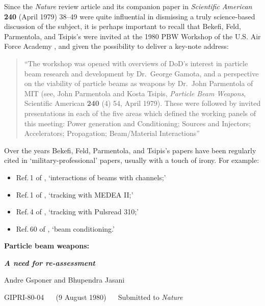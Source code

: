 \documentclass [12pt,a4paper,     ]{report} %
\begin{document}
Since the \emph{Nature} review article and its companion paper in \emph{Scientific American} {\bf 240} (April 1979) 38--49 were quite influential in dismissing a truly science-based discussion of the subject, it is perhaps important to recall that Bekefi, Feld, Parmentola, and Tsipis's  were invited at the 1980 PBW Workshop of the U.S. Air Force Academy \cite{GUENT1980-}, and given the possibility to deliver a key-note address:

\begin{quote}

``The workshop was opened with overviews of DoD's interest in particle beam research and development by Dr.~George Gamota, and a perspective on the viability of particle beams as weapons by Dr.~John Parmentola of MIT (see, John Parmentola and Kosta Tsipis, \emph{Particle Beam Weapons}, Scientific American {\bf 240} (4) 54, April 1979).  These were followed by invited presentations in each of the five areas which defined the working panels of this meeting: Power generation and Conditioning; Sources and Injectors; Accelerators; Propagation; Beam/Material Interactions'' \cite[p.\,1]{GUENT1980-}



\end{quote}
%
Over the years Bekefi, Feld, Parmentola, and Tsipis's papers have been regularly cited in `military-professional' papers, usually with a touch of irony.  For example:

\begin{itemize}

\item Ref.\,1 of \cite{MURPH1987-}, `interactions of beams with channels;'

\item Ref.\,1 of \cite{WELCH1990-}, `tracking with MEDEA II;'

\item Ref.\,4 of \cite{FERNS1991A}, `tracking with Pulsread 310;'

\item Ref.\,60 of \cite{HUBBA1993-}, `beam conditioning.'

\end{itemize}


\vspace{2\baselineskip}

\begin{center}

{\Large \bf Particle beam weapons:}

{\Large \bf \emph{A need for re-assessment} }

\vspace{1\baselineskip}

{\large Andre Gsponer and Bhupendra Jasani}

{\large GIPRI-80-04 ~~ (9 August 1980) ~~ Submitted to \emph{Nature}}

\end{center}
\end{document}
